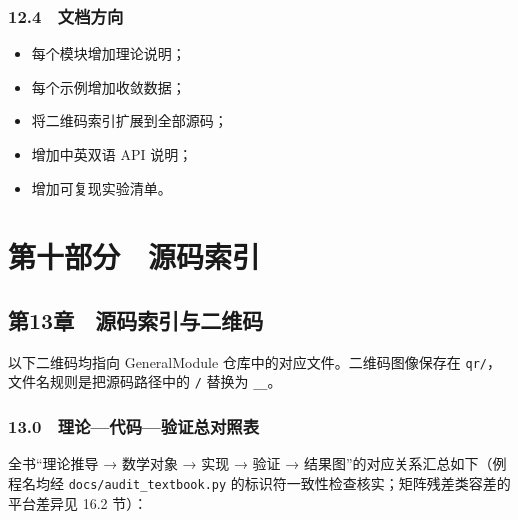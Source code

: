 \documentclass[
]{ctexbook}
\providecommand{\tightlist}{%
  \setlength{\itemsep}{0pt}\setlength{\parskip}{0pt}}
\let\origsection\section
\renewcommand{\section}[1]{%
  \needspace{9\baselineskip}%
  \origsection{#1}%
}
\let\origsubsection\subsection
\renewcommand{\subsection}[1]{%
  \needspace{6\baselineskip}%
  \origsubsection{#1}%
}
\begin{document}
\hypertarget{ux6587ux6863ux65b9ux5411}{%
\subsubsection{12.4　文档方向}\label{ux6587ux6863ux65b9ux5411}}

\begin{itemize}
\tightlist
\item
  每个模块增加理论说明；
\item
  每个示例增加收敛数据；
\item
  将二维码索引扩展到全部源码；
\item
  增加中英双语 API 说明；
\item
  增加可复现实验清单。
\end{itemize}

\hypertarget{ux7b2cux5341ux90e8ux5206-ux6e90ux7801ux7d22ux5f15}{%
\section{第十部分　源码索引}\label{ux7b2cux5341ux90e8ux5206-ux6e90ux7801ux7d22ux5f15}}

\hypertarget{ux7b2c13ux7ae0-ux6e90ux7801ux7d22ux5f15ux4e0eux4e8cux7ef4ux7801}{%
\subsection{第13章　源码索引与二维码}\label{ux7b2c13ux7ae0-ux6e90ux7801ux7d22ux5f15ux4e0eux4e8cux7ef4ux7801}}

以下二维码均指向 GeneralModule 仓库中的对应文件。二维码图像保存在
\texttt{qr/}，文件名规则是把源码路径中的 \texttt{/} 替换为
\texttt{\_\_}。

\hypertarget{ux7406ux8bbaux4ee3ux7801ux9a8cux8bc1ux603bux5bf9ux7167ux8868}{%
\subsubsection{13.0　理论---代码---验证总对照表}\label{ux7406ux8bbaux4ee3ux7801ux9a8cux8bc1ux603bux5bf9ux7167ux8868}}

全书``理论推导 → 数学对象 → 实现 → 验证 →
结果图''的对应关系汇总如下（例程名均经 \texttt{docs/audit\_textbook.py}
的标识符一致性检查核实；矩阵残差类容差的平台差异见 16.2 节）：
\end{document}
